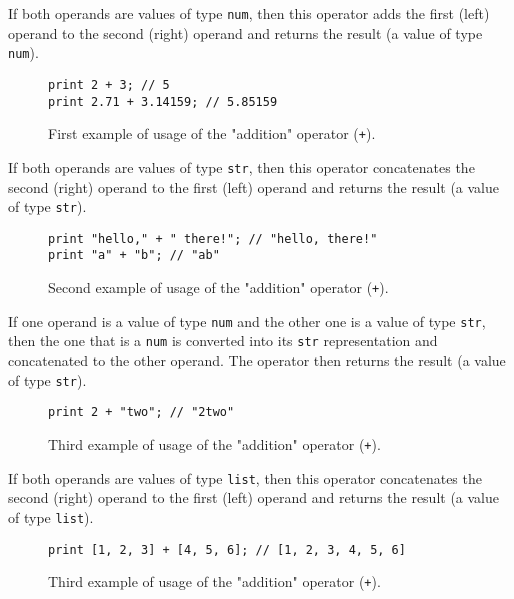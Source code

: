\begin{itemize}
\begin{itemize}
\begin{itemize}
                    If both operands are values of type \texttt{num}, then this operator adds the first (left) operand to the second (right) operand and returns the result (a value of type \texttt{num}).
                    \begin{figure}[H]
                        \centering
                        \begin{lstlisting}
print 2 + 3; // 5
print 2.71 + 3.14159; // 5.85159
                        \end{lstlisting}
                        \caption{First example of usage of the "addition" operator (\texttt{+}).}
                    \end{figure}

                    If both operands are values of type \texttt{str}, then this operator concatenates the second (right) operand to the first (left) operand and returns the result (a value of type \texttt{str}).
                    \begin{figure}[H]
                        \centering
                        \begin{lstlisting}
print "hello," + " there!"; // "hello, there!"
print "a" + "b"; // "ab"
                        \end{lstlisting}
                        \caption{Second example of usage of the "addition" operator (\texttt{+}).}
                    \end{figure}

                    If one operand is a value of type \texttt{num} and the other one is a value of type \texttt{str}, then the one that is a \texttt{num} is converted into its \texttt{str} representation and concatenated to the other operand. The operator then returns the result (a value of type \texttt{str}).
                    \begin{figure}[H]
                        \centering
                        \begin{lstlisting}
print 2 + "two"; // "2two"
                        \end{lstlisting}
                        \caption{Third example of usage of the "addition" operator (\texttt{+}).}
                    \end{figure}

                    If both operands are values of type \texttt{list}, then this operator concatenates the second (right) operand to the first (left) operand and returns the result (a value of type \texttt{list}).
                    \begin{figure}[H]
                        \centering
                        \begin{lstlisting}
print [1, 2, 3] + [4, 5, 6]; // [1, 2, 3, 4, 5, 6]
                        \end{lstlisting}
                        \caption{Third example of usage of the "addition" operator (\texttt{+}).}
                    \end{figure}
                    

\end{itemize}
\end{itemize}
\end{itemize}

